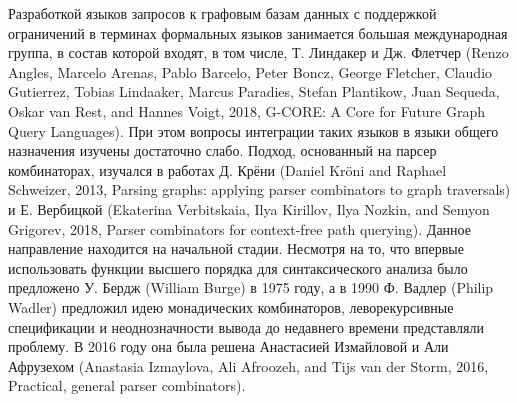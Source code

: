 \documentclass[12pt]{article}  %
\theoremstyle{remark}
\begin{document}
Разработкой языков запросов к графовым базам данных с поддержкой ограничений в терминах формальных языков занимается большая международная группа, в состав которой входят, в том числе, Т. Линдакер и Дж. Флетчер (Renzo Angles, Marcelo Arenas, Pablo Barcelo, Peter Boncz, George Fletcher, Claudio Gutierrez, Tobias Lindaaker, Marcus Paradies, Stefan Plantikow, Juan Sequeda, Oskar van Rest, and Hannes Voigt, 2018, G-CORE: A Core for Future Graph Query Languages). При этом вопросы интеграции таких языков в языки общего назначения изучены достаточно слабо. Подход, основанный на парсер комбинаторах, изучался в работах Д. Крёни (Daniel Kröni and Raphael Schweizer, 2013, Parsing graphs: applying parser combinators to graph traversals) и Е. Вербицкой (Ekaterina Verbitskaia, Ilya Kirillov, Ilya Nozkin, and Semyon Grigorev, 2018, Parser combinators for context-free path querying). Данное направление находится на начальной стадии.
Несмотря на то, что впервые использовать функции высшего порядка для синтаксического анализа было предложено У. Бердж (William Burge) в 1975 году, а в 1990 Ф. Вадлер (Philip Wadler) предложил идею монадических комбинаторов, леворекурсивные спецификации и неоднозначности вывода до недавнего времени представляли проблему.
В 2016 году она была решена Анастасией Измайловой и Али Афрузехом (Anastasia Izmaylova, Ali Afroozeh, and Tijs van der Storm, 2016, Practical, general parser combinators).
\end{document}
